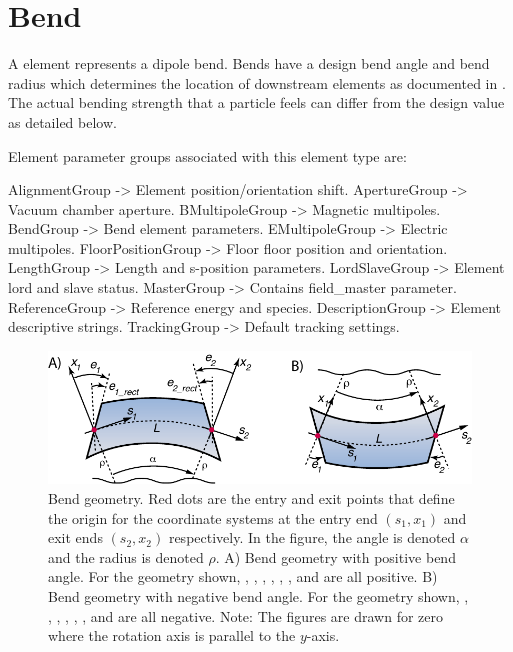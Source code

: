 \newpage

\section{Bend}
\label{s:bend}

A  element represents a dipole bend. Bends have a design bend angle and bend radius
which determines the location of downstream elements as documented in .
The actual bending strength that a particle feels can differ from the design value as detailed
below.

Element parameter groups associated with this element type are:
\TOPrule
\begin{example}
  AlignmentGroup     -> Element position/orientation shift.  
  ApertureGroup      -> Vacuum chamber aperture.  
  BMultipoleGroup    -> Magnetic multipoles.  
  BendGroup          -> Bend element parameters.  
  EMultipoleGroup    -> Electric multipoles.  
  FloorPositionGroup -> Floor floor position and orientation.  
  LengthGroup        -> Length and s-position parameters.  
  LordSlaveGroup     -> Element lord and slave status.  
  MasterGroup        -> Contains field_master parameter.  
  ReferenceGroup     -> Reference energy and species.  
  DescriptionGroup   -> Element descriptive strings.  
  TrackingGroup      -> Default tracking settings.  
\end{example}
\BOTTOMrule


\begin{figure}[ht]
  \centering \includegraphics{bend.pdf} 
\caption[Bend geometry]{
Bend geometry. Red dots are the entry and exit points that define the origin for the
coordinate systems at the entry end $(s_1, x_1)$ and exit ends $(s_2, x_2)$ respectively. 
In the figure, the angle  is denoted $\alpha$ and the radius
 is denoted $\rho$.
A) Bend geometry with positive bend angle. For the geometry shown, 
, , , , , , and  are all positive.
B) Bend geometry with negative bend angle. For the geometry shown, 
, , , , , , and  are all negative.
Note: The figures are drawn for zero  where the rotation axis is parallel to the 
$y$-axis. 
}
\label{f:bend2}
\end{figure}


